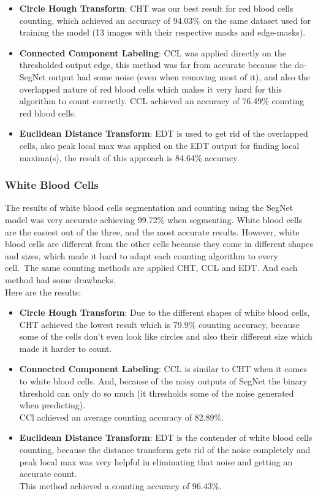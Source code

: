 \documentclass[conference]{IEEEtran}
\begin{document}
\begin{itemize}
  \item \textbf{Circle Hough Transform}: CHT was our best result for red blood cells counting, which achieved an accuracy of 94.03\% on the same dataset used for training the model (13 images with their respective masks and edge-masks).
  \item \textbf{Connected Component Labeling}: CCL was applied directly on the thresholded output edge, this method was far from accurate because the do-SegNet output had some noise (even when removing most of it), and also the overlapped nature of red blood cells which makes it very hard for this algorithm to count correctly. CCL achieved an accuracy of 76.49\% counting red blood cells.
  \item \textbf{Euclidean Distance Transform}: EDT is used to get rid of the overlapped cells, also peak local max was applied on the EDT output for finding local maxima(s), the result of this approach is 84.64\% accuracy.
\end{itemize}


\subsubsection{White Blood Cells}
\hspace{\parindent}
The results of white blood cells segmentation and counting using the SegNet model was very accurate achieving 99.72\% when segmenting.
White blood cells are the easiest out of the three, and the most accurate results.
However, white blood cells are different from the other cells because they come in different shapes and sizes, which made it hard to adapt each counting algorithm to every cell.\
The same counting methods are applied CHT, CCL and EDT. And each method had some drawbacks.\\
Here are the results:

\begin{itemize}
  \item \textbf{Circle Hough Transform}: Due to the different shapes of white blood cells, CHT achieved the lowest result which is 79.9\% counting accuracy, because some of the cells don't even look like circles and also their different size which made it harder to count.
  \item \textbf{Connected Component Labeling}: CCL is similar to CHT when it comes to white blood cells. And, because of the noisy outputs of SegNet the binary threshold can only do so much (it thresholds some of the noise generated when predicting).\\
    CCl achieved an average counting accuracy of 82.89\%.
  \item \textbf{Euclidean Distance Transform}: EDT is the contender of white blood cells counting, because the distance transform gets rid of the noise completely and peak local max was very helpful in eliminating that noise and getting an accurate count.\\
    This method achieved a counting accuracy of 96.43\%.
\end{itemize}
\end{document}
